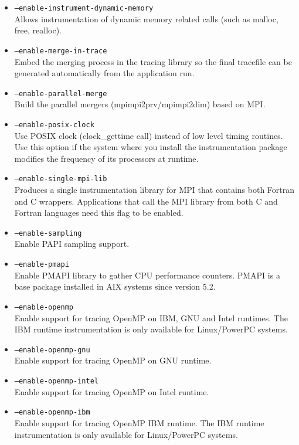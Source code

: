 \begin{itemize}

    \item {\tt --enable-instrument-dynamic-memory} \\
	Allows instrumentation of dynamic memory related calls (such as malloc, free, realloc).
	\item {\tt --enable-merge-in-trace} \\
	Embed the merging process in the tracing library so the final tracefile can be generated automatically from the application run.
	\item {\tt --enable-parallel-merge} \\
	Build the parallel mergers (mpimpi2prv/mpimpi2dim) based on MPI.
	\item {\tt --enable-posix-clock} \\
	Use POSIX clock (clock\_gettime call) instead of low level timing routines. Use this option if the system where you install the instrumentation package modifies the frequency of its processors at runtime.
	\item {\tt --enable-single-mpi-lib} \\
	Produces a single instrumentation library for MPI that contains both Fortran and C wrappers. Applications that call the MPI library from both C and Fortran languages need this flag to be enabled.
	\item {\tt --enable-sampling} \\
	Enable PAPI sampling support.
	\item {\tt --enable-pmapi} \\
	Enable PMAPI library to gather CPU performance counters. PMAPI is a base package installed in AIX systems since version 5.2.
	\item {\tt --enable-openmp} \\
	Enable support for tracing OpenMP on IBM, GNU and Intel runtimes. The IBM runtime instrumentation is only available for Linux/PowerPC systems.
	\item {\tt --enable-openmp-gnu} \\
	Enable support for tracing OpenMP on GNU runtime.
	\item {\tt --enable-openmp-intel} \\
	Enable support for tracing OpenMP on Intel runtime.
	\item {\tt --enable-openmp-ibm} \\
	Enable support for tracing OpenMP IBM runtime. The IBM runtime instrumentation is only available for Linux/PowerPC systems.

\end{itemize}
